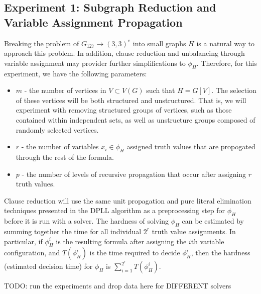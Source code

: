 \documentclass[paper=a4, fontsize=11pt]{scrartcl} %
\newcommand{\TODO}{{\color{red}TODO}}
\begin{document}
\subsection{Experiment 1: Subgraph Reduction and Variable Assignment Propagation}
Breaking the problem of $G_{127} \to (3,3)^e$ into small graphs $H$ is a natural way
to approach this problem. In addition, clause reduction and unbalancing through
variable assignment may provider further simplifications to $\phi_H$.
Therefore, for this experiment, we have the following parameters:
\begin{itemize}
	\item $m$ - the number of vertices in $V \subset V(G)$ such that $H = G[V]$. The selection of
	these vertices will be both structured and unstructured. That is, we will experiment
	with removing structured groups of vertices, such as those contained within independent 
	sets, as well as unstructure groups composed of randomly selected vertices.
	\item $r$ - the number of variables $x_i \in \phi_H$ assigned truth values that are
	propogated through the rest of the formula. 
	\item $p$ - the number of levels of recursive propagation that occur after assigning 
	$r$ truth values.
\end{itemize}
Clause reduction will use the same unit propagation and pure literal elimination techniques
presented in the DPLL algorithm as a preprocessing step for $\phi_H$ before it is run with a solver.
The hardness of solving $\phi_H$ can be estimated by summing together the time for
all individual $2^r$ truth value assignments. In particular, if $\phi_H^i$ is the
resulting formula after assigning the $i$th variable configuration, and $T(\phi_H^i)$ 
is the time required to decide $\phi_H^i$, then the hardness (estimated decision time)
for $\phi_H$ is $\sum_{i = 1}^{2^r} T(\phi_H^i)$.

\TODO: run the experiments and drop data here for DIFFERENT solvers
\end{document}
